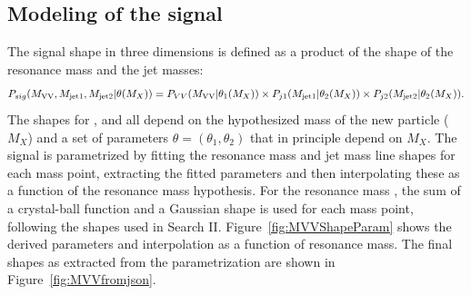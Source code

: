 \subsection{Modeling of the signal}
The signal shape in three dimensions is defined as a product of the shape of the resonance mass and the jet masses:
\begin{equation}
	\small
	P_{sig}(M_{\rm VV},M_{\rm jet1},M_{\rm jet2}|\theta(M_X) ) = P_{VV}(M_{\rm VV}|\theta_1(M_X)) \times P_{j1}(M_{\rm jet1}|\theta_2(M_X))\\ \times P_{j2}(M_{\rm jet2}|\theta_2(M_X)).
\end{equation} 
The shapes for \MVV, \MJO and \MJT all depend on the hypothesized mass of the new particle ($M_X$) and a set of parameters $\theta=(\theta_1, \theta_2)$ that in principle depend on $M_X$.
The signal is parametrized by fitting the resonance mass and jet mass line shapes for each mass point, extracting the fitted parameters and then interpolating these as a function of the resonance mass
hypothesis. 
For the resonance mass \MVV, the sum of a crystal-ball function and a Gaussian shape is used for each mass point, following the shapes used in Search II.
Figure~\ref{fig:MVVShapeParam} shows the derived parameters and interpolation as a function of resonance mass.
The final \MVV shapes as extracted from the parametrization are shown in Figure~\ref{fig:MVVfromjson}.

